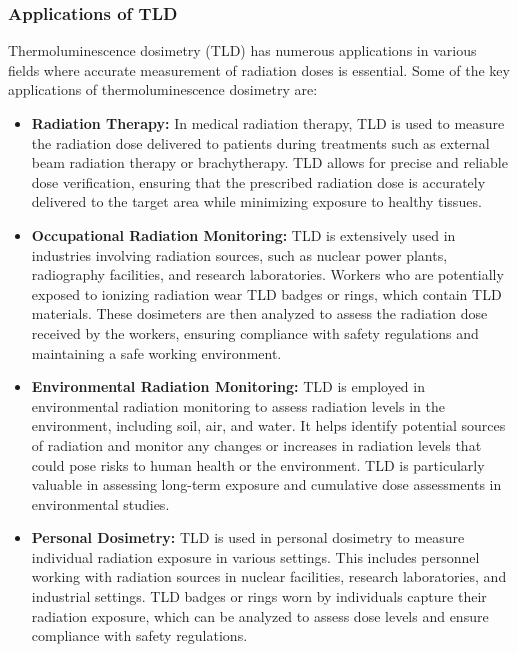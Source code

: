 \documentclass[../../Report.tex]{subfiles}
\begin{document}
    \subsubsection*{\large Applications of TLD}
        Thermoluminescence dosimetry (TLD) has numerous applications in various fields where accurate measurement of 
        radiation doses is essential. Some of the key applications of thermoluminescence dosimetry are:

        \begin{itemize}
            \item \textbf{Radiation Therapy: } In medical radiation therapy, TLD is used to measure the radiation dose 
            delivered to patients during treatments such as external beam radiation therapy or brachytherapy. 
            TLD allows for precise and reliable dose verification, ensuring that the prescribed radiation dose is 
            accurately delivered to the target area while minimizing exposure to healthy tissues.

            \item \textbf{Occupational Radiation Monitoring: } TLD is extensively used in industries involving radiation 
            sources, such as nuclear power plants, radiography facilities, and research laboratories. Workers who are 
            potentially exposed to ionizing radiation wear TLD badges or rings, which contain TLD materials. These 
            dosimeters are then analyzed to assess the radiation dose received by the workers, ensuring compliance with 
            safety regulations and maintaining a safe working environment.

            \item \textbf{Environmental Radiation Monitoring: } TLD is employed in environmental radiation monitoring 
            to assess radiation levels in the environment, including soil, air, and water. It helps identify potential 
            sources of radiation and monitor any changes or increases in radiation levels that could pose risks to human 
            health or the environment. TLD is particularly valuable in assessing long-term exposure and cumulative dose 
            assessments in environmental studies.

            \item \textbf{Personal Dosimetry: } TLD is used in personal dosimetry to measure individual radiation 
            exposure in various settings. This includes personnel working with radiation sources in nuclear facilities, 
            research laboratories, and industrial settings. TLD badges or rings worn by individuals capture their 
            radiation exposure, which can be analyzed to assess dose levels and ensure compliance with safety 
            regulations.


\end{itemize}
\end{document}
